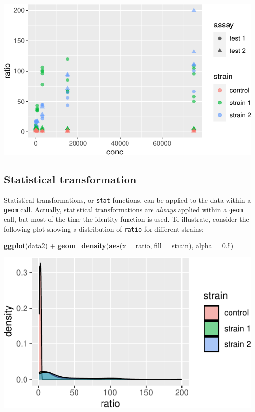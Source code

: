 \documentclass[]{book}
\newenvironment{Shaded}{}{}
\newcommand{\DataTypeTok}[1]{\textcolor[rgb]{0.56,0.13,0.00}{#1}}
\newcommand{\FloatTok}[1]{\textcolor[rgb]{0.25,0.63,0.44}{#1}}
\newcommand{\KeywordTok}[1]{\textcolor[rgb]{0.00,0.44,0.13}{\textbf{#1}}}
\newcommand{\NormalTok}[1]{#1}
\newcommand{\OperatorTok}[1]{\textcolor[rgb]{0.40,0.40,0.40}{#1}}
\newcommand{\StringTok}[1]{\textcolor[rgb]{0.25,0.44,0.63}{#1}}
\begin{document}
\begin{center}\includegraphics[width=\textwidth]{TRES-Tidy-Tutorial_files/figure-latex/unnamed-chunk-112-1} \end{center}

\hypertarget{statistical-transformation}{%
\subsection{Statistical transformation}\label{statistical-transformation}}

Statistical transformations, or \texttt{stat} functions, can be applied to the data within a \texttt{geom} call. Actually, statistical transformations are \emph{always} applied within a \texttt{geom} call, but most of the time the identity function is used. To illustrate, consider the following plot showing a distribution of \texttt{ratio} for different strains:

\begin{Shaded}
\begin{Highlighting}[]
\KeywordTok{ggplot}\NormalTok{(data2) }\OperatorTok{+}
\StringTok{  }\KeywordTok{geom_density}\NormalTok{(}\KeywordTok{aes}\NormalTok{(}\DataTypeTok{x =}\NormalTok{ ratio, }\DataTypeTok{fill =}\NormalTok{ strain), }\DataTypeTok{alpha =} \FloatTok{0.5}\NormalTok{)}
\end{Highlighting}
\end{Shaded}

\begin{center}\includegraphics[width=\textwidth]{TRES-Tidy-Tutorial_files/figure-latex/unnamed-chunk-113-1} \end{center}
\end{document}
